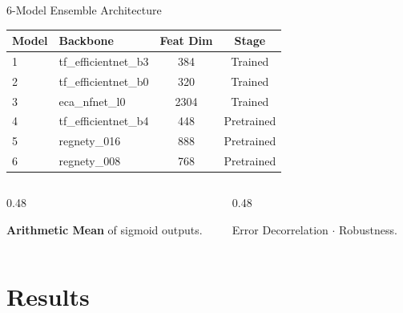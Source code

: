 \documentclass[aspectratio=169, 11pt]{beamer}
\begin{document}
\begin{frame}{6-Model Ensemble Architecture}
    \begin{center}
        \scriptsize
        \begin{tabular}{llcc}
            \toprule
            \textbf{\textcolor{draculapink}{Model}} & \textbf{Backbone} & \textbf{Feat Dim} & \textbf{Stage} \\
            \midrule
            1 & tf\_efficientnet\_b3 & 384 & Trained \\
            2 & tf\_efficientnet\_b0 & 320 & Trained \\
            3 & eca\_nfnet\_l0 & 2304 & Trained \\
            4 & tf\_efficientnet\_b4 & 448 & Pretrained \\
            5 & regnety\_016 & 888 & Pretrained \\
            6 & regnety\_008 & 768 & Pretrained \\
            \bottomrule
        \end{tabular}
    \end{center}

    \begin{columns}[T, onlytextwidth]
        \begin{column}{0.48\textwidth}
            \begin{tcolorbox}[draculabox={Strategy}]
                \scriptsize \textbf{Arithmetic Mean} of sigmoid outputs.
            \end{tcolorbox}
        \end{column}
        \begin{column}{0.48\textwidth}
            \begin{tcolorbox}[orangebox_tcb={Why?}]
                \scriptsize Error Decorrelation $\cdot$ Robustness.
            \end{tcolorbox}
        \end{column}
    \end{columns}
\end{frame}

\section{Results}
\end{document}
